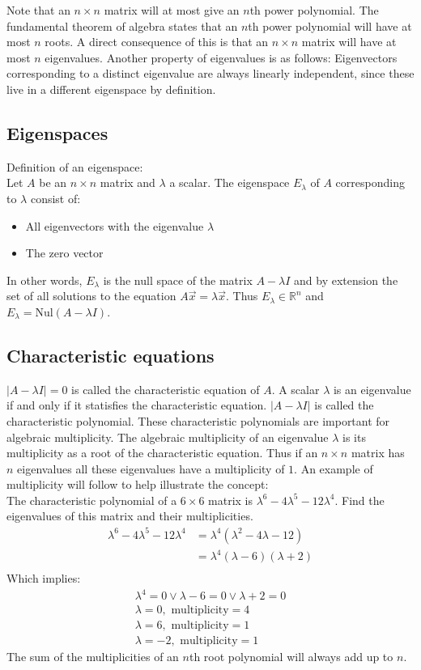 \documentclass[11pt, a4paper]{article}
\newcommand*{\R}{\ensuremath{\mathbb{R}}}
\begin{document}
Note that an $n \times n$ matrix will at most give an $n$th power polynomial. The fundamental theorem of algebra states that an $n$th power polynomial will have at most $n$ roots. A direct consequence of this is that an $n \times n$ matrix will have at most $n$ eigenvalues. Another property of eigenvalues is as follows: Eigenvectors corresponding to a distinct eigenvalue are always linearly independent, since these live in a different eigenspace by definition.


\subsection{Eigenspaces}
Definition of an eigenspace:\\
Let $A$ be an $n \times n$ matrix and $\lambda$ a scalar. The eigenspace $E_\lambda$ of $A$ corresponding to $\lambda$ consist of:
\begin{itemize}
  \item All eigenvectors with the eigenvalue $\lambda$
  \item The zero vector
\end{itemize}
In other words, $E_\lambda$ is the null space of the matrix $A-\lambda I$ and by extension the set of all solutions to the equation $A\vec{x} = \lambda \vec{x}$. Thus $E_\lambda \in \R^n$ and $E_\lambda = \text{Nul}(A-\lambda I)$.


\subsection{Characteristic equations}
$|A-\lambda I| = 0$ is called the characteristic equation of $A$. A scalar $\lambda$ is an eigenvalue if and only if it statisfies the characteristic equation. $|A-\lambda I|$ is called the characteristic polynomial. These characteristic polynomials are important for algebraic multiplicity. The algebraic multiplicity of an eigenvalue $\lambda$ is its multiplicity as a root of the characteristic equation. Thus if an $n \times n$ matrix has $n$ eigenvalues all these eigenvalues have a multiplicity of $1$. An example of multiplicity will follow to help illustrate the concept:\\
The characteristic polynomial of a $6 \times 6$ matrix is $\lambda^6 - 4\lambda^5 - 12\lambda^4$. Find the eigenvalues of this matrix and their multiplicities.
\begin{align*}
  \lambda^6 - 4\lambda^5 - 12\lambda^4 &= \lambda^4(\lambda^2 - 4\lambda - 12)\\
                                       &= \lambda^4(\lambda - 6)(\lambda + 2)\\
\end{align*}
Which implies:
\begin{gather*}
  \lambda^4 = 0 \vee \lambda-6 = 0 \vee \lambda+2=0\\
  \lambda = 0, \text{ multiplicity}=4\\
  \lambda = 6, \text{ multiplicity}=1\\
  \lambda = -2, \text{ multiplicity}=1
\end{gather*}
The sum of the multiplicities of an $n$th root polynomial will always add up to $n$.
\end{document}
